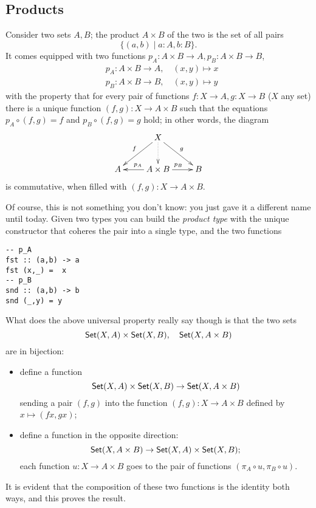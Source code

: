 \documentclass[11pt]{article}
\begin{document}
\subsection{Products}
Consider two sets \(A,B\); the product \(A\times B\) of the two is the set of all pairs
\[
	\{(a,b)\mid a : A, b : B\}.
\]
It comes equipped with two functions \(p_A : A\times B \to A, p_B : A\times B \to B\),
\begin{align*}
	 & p_A \colon A \times B \to A,\quad (x,y) \mapsto x \\
	 & p_B \colon A \times B \to B,\quad (x,y) \mapsto y
\end{align*}
with the property that for every pair of functions \(f : X \to A, g : X \to B\) (\(X\) any set) there is a unique function \((f,g) : X \to A\times B\) such that the equations \(p_A \circ (f,g)=f\) and \(p_B\circ (f,g)=g\) hold; in other words, the diagram
\begin{equation}\label{prodUP}
	\vcenter{\xymatrix{
			& X \ar[dl]_f \ar[dr]^g \ar@{.>}[d] & \\
			A & A \times B \ar[l]_{p_A} \ar[r]^{p_B} & B
		}}
\end{equation}
is commutative, when filled with \((f,g) : X \to A\times B\).

Of course, this is not something you don't know: you just gave it a different name until today. Given two types  you can build the \emph{product type}  with the unique constructor \mil{(,)} that coheres the pair  into a single type, and the two functions
\begin{verbatim}
-- p_A
fst :: (a,b) -> a
fst (x,_) =  x
-- p_B
snd :: (a,b) -> b
snd (_,y) = y
\end{verbatim}
What does the above universal property really say though is that the two sets
\begin{equation}\label{isocano}
	{\sf Set}(X, A)\times {\sf Set}(X,B),\quad {\sf Set}(X, A\times B)
\end{equation}
are in bijection:
\begin{itemize}
	\item define a function $${\sf Set}(X, A)\times {\sf Set}(X,B)\to {\sf Set}(X, A\times B)$$ sending a pair $(f,g)$ into the function $(f,g) : X \to A\times B$ defined by $x\mapsto (fx, gx)$;
	\item define a function in the opposite direction: $${\sf Set}(X, A\times B) \to{\sf Set}(X, A)\times {\sf Set}(X,B);$$ each function $u : X\to A\times B$ goes to the pair of functions $(\pi_A\circ u, \pi_B\circ u)$.
\end{itemize}
It is evident that the composition of these two functions is the identity both ways, and this proves the result.
\end{document}
